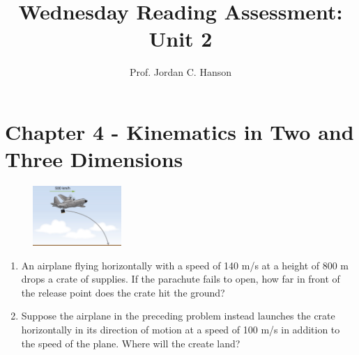 \documentclass{article}
\begin{document}
\title{Wednesday Reading Assessment: Unit 2}
\author{Prof. Jordan C. Hanson}

\maketitle

\section{Chapter 4 - Kinematics in Two and Three Dimensions}

\begin{figure}[ht]
\centering
\includegraphics[width=0.3\textwidth]{plane.png}
\end{figure}

\begin{enumerate}
\item An airplane flying horizontally with a speed of 140 m/s at a height of 800 m drops a crate of supplies.  If the parachute fails to open, how far in front of the release point does the crate hit the ground? \\ \vspace{5cm}
\item Suppose the airplane in the preceding problem instead launches the crate horizontally in its direction of motion at a speed of 100 m/s in addition to the speed of the plane.  Where will the create land?
\end{enumerate}
\end{document}
